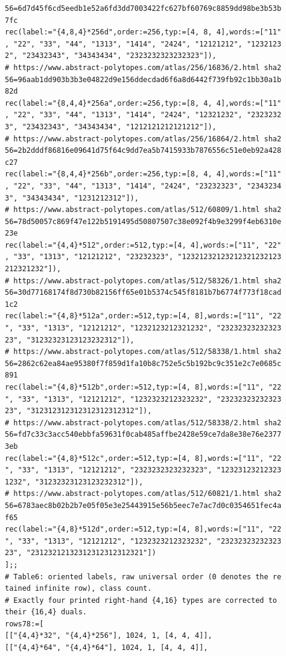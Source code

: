 \documentclass[
  11pt,
  a4paper,
]{article}
\begin{document}
\begin{verbatim}
56=6d7d45f6cd5eedb1e52a6fd3dd7003422fc627bf60769c8859dd98be3b53b
7fc
rec(label:="{4,8,4}*256d",order:=256,typ:=[4, 8, 4],words:=["11"
, "22", "33", "44", "1313", "1414", "2424", "12121212", "1232123
2", "23432343", "34343434", "2323232323232323"]),
# https://www.abstract-polytopes.com/atlas/256/16836/2.html sha2
56=96aab1dd903b3b3e04822d9e156ddecdad6f6a8d6442f739fb92c1bb30a1b
82d
rec(label:="{8,4,4}*256a",order:=256,typ:=[8, 4, 4],words:=["11"
, "22", "33", "44", "1313", "1414", "2424", "12321232", "2323232
3", "23432343", "34343434", "1212121212121212"]),
# https://www.abstract-polytopes.com/atlas/256/16864/2.html sha2
56=2b2dddf86816e09641d75f64c9dd7ea5b7415933b7876556c51e0eb92a428
c27
rec(label:="{8,4,4}*256b",order:=256,typ:=[8, 4, 4],words:=["11"
, "22", "33", "44", "1313", "1414", "2424", "23232323", "2343234
3", "34343434", "1231212312"]),
# https://www.abstract-polytopes.com/atlas/512/60809/1.html sha2
56=78d50057c869f47e122b5191495d50807507c38e092f4b9e3299f4eb6310e
23e
rec(label:="{4,4}*512",order:=512,typ:=[4, 4],words:=["11", "22"
, "33", "1313", "12121212", "23232323", "12321232123212321232123
212321232"]),
# https://www.abstract-polytopes.com/atlas/512/58326/1.html sha2
56=30d77168174f8d730b82156ff65e01b5374c545f8181b7b6774f773f18cad
1c2
rec(label:="{4,8}*512a",order:=512,typ:=[4, 8],words:=["11", "22
", "33", "1313", "12121212", "1232123212321232", "23232323232323
23", "31232323123123232312"]),
# https://www.abstract-polytopes.com/atlas/512/58338/1.html sha2
56=2862c62ea84ae95380f7f859d1fa10b8c752e5c5b192bc9c351e2c7e0685c
891
rec(label:="{4,8}*512b",order:=512,typ:=[4, 8],words:=["11", "22
", "33", "1313", "12121212", "1232323212323232", "23232323232323
23", "312312312312312312312312"]),
# https://www.abstract-polytopes.com/atlas/512/58338/2.html sha2
56=fd7c33c3acc540ebbfa59631f0cab485affbe2428e59ce7da8e38e76e2377
3eb
rec(label:="{4,8}*512c",order:=512,typ:=[4, 8],words:=["11", "22
", "33", "1313", "12121212", "2323232323232323", "12323123212323
1232", "31232323123123232312"]),
# https://www.abstract-polytopes.com/atlas/512/60821/1.html sha2
56=6783aec8b02b2b7e05f05e3e25443915e56b5eec7e7ac7d0c0354651fec4a
f65
rec(label:="{4,8}*512d",order:=512,typ:=[4, 8],words:=["11", "22
", "33", "1313", "12121212", "1232323212323232", "23232323232323
23", "23123212132312312312312321"])
];;
# Table6: oriented labels, raw universal order (0 denotes the re
tained infinite row), class count.
# Exactly four printed right-hand {4,16} types are corrected to 
their {16,4} duals.
rows78:=[
[["{4,4}*32", "{4,4}*256"], 1024, 1, [4, 4, 4]],
[["{4,4}*64", "{4,4}*64"], 1024, 1, [4, 4, 4]],

\end{verbatim}
\end{document}
